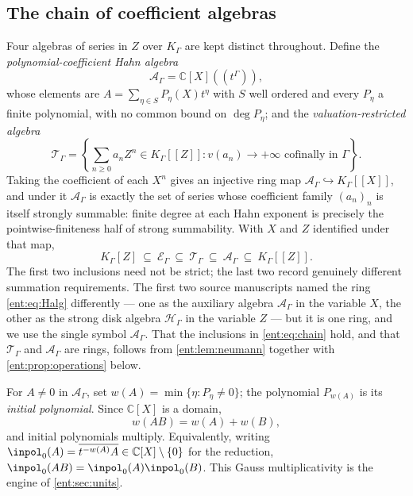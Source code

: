 \documentclass[11pt]{article}
\theoremstyle{plain}
\theoremstyle{plain}
\theoremstyle{plain}
\theoremstyle{definition}
\theoremstyle{definition}
\theoremstyle{definition}
\theoremstyle{definition}
\theoremstyle{remark}
\newcommand{\C}{\mathbb C}\newcommand{\R}{\mathbb R}
\newcommand{\K}{K_\Gamma}\newcommand{\KD}{K_\Delta}
\newcommand{\E}{\mathcal E_\Gamma}
\newcommand{\A}{\mathcal A_\Gamma}\newcommand{\OO}{\mathcal O_\Gamma}
\newcommand{\TT}{\mathcal T_\Gamma}
\begin{document}
\subsection{The chain of coefficient algebras}
\label{ent:subsec:chain}
Four algebras of series in $Z$ over $\K$ are kept distinct throughout.
Define the \emph{polynomial-coefficient Hahn algebra}
\begin{equation}\label{ent:eq:Halg}
 \A=\C[X]((t^\Gamma)),
\end{equation}
whose elements are $A=\sum_{\eta\in S}P_\eta(X)t^\eta$ with $S$ well ordered
and every $P_\eta$ a finite polynomial, with no common bound on
$\deg P_\eta$; and the \emph{valuation-restricted algebra}
\begin{equation}\label{ent:eq:Talg}
 \TT=\left\{\sum_{n\ge0}a_nZ^n\in\K[[Z]]:
  v(a_n)\to+\infty\text{ cofinally in }\Gamma\right\}.
\end{equation}
Taking the coefficient of each $X^n$ gives an injective ring map
$\A\hookrightarrow\K[[X]]$, and under it $\A$ is exactly the set of series
whose coefficient family $(a_n)_n$ is itself strongly summable: finite degree
at each Hahn exponent is precisely the pointwise-finiteness half of strong
summability. With $X$ and $Z$ identified under that map,
\begin{equation}\label{ent:eq:chain}
 \K[Z]\ \subseteq\ \E\ \subseteq\ \TT\ \subseteq\ \A\ \subseteq\ \K[[Z]].
\end{equation}
The first two inclusions need not be strict; the last two record genuinely
different summation requirements. The first two source manuscripts named the ring
\eqref{ent:eq:Halg} differently --- one as the auxiliary algebra $\A$ in the
variable $X$, the other as the strong disk algebra $\mathcal H_\Gamma$ in the
variable $Z$ --- but it is one ring, and we use the single symbol $\A$. That
the inclusions in \eqref{ent:eq:chain} hold, and that $\TT$ and $\A$ are
rings, follows from \cref{ent:lem:neumann} together with
\cref{ent:prop:operations} below.

For $A\ne0$ in $\A$, set $w(A)=\min\{\eta:P_\eta\ne0\}$; the polynomial
$P_{w(A)}$ is its \emph{initial polynomial}. Since $\C[X]$ is a domain,
\begin{equation}\label{ent:eq:gauss-mult}
 w(AB)=w(A)+w(B),
\end{equation}
and initial polynomials multiply. Equivalently, writing
$\inpol_0(A)=\overline{t^{-w(A)}A}\in\C[X]\setminus\{0\}$ for the reduction,
$\inpol_0(AB)=\inpol_0(A)\inpol_0(B)$. This Gauss multiplicativity is the
engine of \cref{ent:sec:units}.
\end{document}
